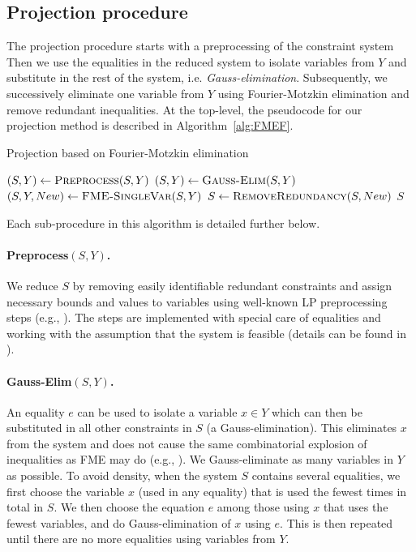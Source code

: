 \documentclass{llncs}
\begin{document}
\subsection{Projection procedure}\label{sec:projMethod}
The projection procedure starts with a preprocessing of the constraint system
Then we use the equalities in the reduced system to isolate variables from $Y$ and substitute in the rest of the system, i.e. \emph{Gauss-elimination}.  
Subsequently, we successively eliminate one variable from $Y$ using Fourier-Motzkin elimination and remove redundant inequalities. At the top-level, the pseudocode for our projection method is described in Algorithm~\ref{alg:FMEF}. 
\setlength{\floatsep}{10pt} %
\setlength{\textfloatsep}{14pt} %
\begin{algorithm}[t!]
\caption{Projection based on Fourier-Motzkin elimination} 
\label{alg:FMEF}
\begin{algorithmic}
	\State $(S,Y)\gets \Call{Preprocess}{S,Y}$
	\State $(S,Y)\gets\Call{Gauss-Elim}{S,Y}$
		\State $(S, Y, New )\gets\Call{FME-SingleVar}{S,Y}$
		\State $S\gets\Call{RemoveRedundancy}{S,New}$
	\EndWhile
	\State \Return $S$
\EndFunction
\end{algorithmic}
\end{algorithm}
Each sub-procedure in this algorithm is detailed further below. 

\paragraph{{\sc Preprocess}$(S,Y)$.}
We reduce $S$ by removing easily identifiable redundant constraints and assign necessary bounds and values to variables using well-known LP preprocessing steps (e.g., \cite{brearley75,andersen95,maros}). The steps are implemented with special care of equalities and working with the assumption that the system is feasible (details can be found in \cite{mytechrep}).

\paragraph{{\sc Gauss-Elim}$(S,Y)$.} 
An equality $e$ can be used to isolate a variable $ x\in Y$ which can then be substituted in all other constraints in $S$ (a Gauss-elimination). This eliminates $x$ from the system and does not cause the same combinatorial explosion of inequalities as FME may do (e.g., \cite{duffin74,simon05}). We Gauss-eliminate as many variables in $Y$ as possible. To avoid density, when the system $S$ contains several equalities, we first choose the variable $x$ (used in any equality) that is used the fewest times in total in $S$. We then choose the equation $e$ among those using $x$ that uses the fewest variables, and do Gauss-elimination of $x$ using $e$. This is then repeated until there are no more equalities using variables from $Y$.
\end{document}
